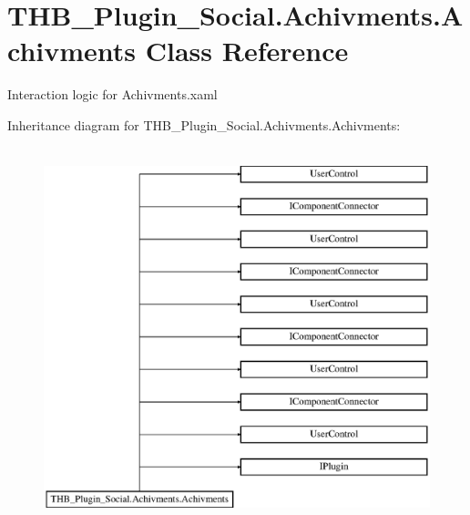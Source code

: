 \hypertarget{class_t_h_b___plugin___social_1_1_achivments_1_1_achivments}{}\section{T\+H\+B\+\_\+\+Plugin\+\_\+\+Social.\+Achivments.\+Achivments Class Reference}
\label{class_t_h_b___plugin___social_1_1_achivments_1_1_achivments}


Interaction logic for Achivments.\+xaml  


Inheritance diagram for T\+H\+B\+\_\+\+Plugin\+\_\+\+Social.\+Achivments.\+Achivments\+:\begin{figure}[H]
\begin{center}
\leavevmode
\includegraphics[height=11.000000cm]{d8/dcc/class_t_h_b___plugin___social_1_1_achivments_1_1_achivments}
\end{center}
\end{figure}
